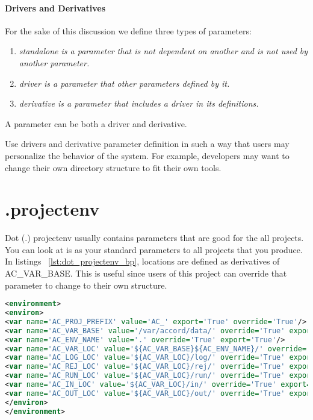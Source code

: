 \documentclass[design.tex]{subfiles}
\begin{document}
\paragraph{Drivers and Derivatives}
For the sake of this discussion we define three types of parameters:
\begin{enumerate}
	\item \em{standalone} is a parameter that is not dependent on another and is not used by another parameter.
	\item \em{driver} is a parameter that other parameters defined by it.
	\item \em{derivative} is a parameter that includes a driver in its definitions.
\end{enumerate}

A parameter can be both a driver and derivative.

Use drivers and derivative parameter definition in such a way that users may personalize the behavior of the system.  For example, developers may want to change their own directory structure to fit their own tools.
 

\section{.projectenv}
Dot (.) projectenv usually contains parameters that are good for the all projects.  You can look at is as your standard parameters to all projects that you produce. In listings ~\ref{lst:dot_projectenv_bp}, locations are defined as derivatives of AC\_VAR\_BASE. This is useful since users of this project can override that parameter to change to their own structure.

\begin{lstlisting}[language=XML, label=lst:dot_projectenv_bp, caption='.projectenv.xml example']
<environment>
<environ>
<var name='AC_PROJ_PREFIX' value='AC_' export='True' override='True'/>
<var name='AC_VAR_BASE' value='/var/accord/data/' override='True' export='True'/>
<var name='AC_ENV_NAME' value='.' override='True' export='True'/>
<var name='AC_VAR_LOC' value='${AC_VAR_BASE}${AC_ENV_NAME}/' override='True' export='True'/>
<var name='AC_LOG_LOC' value='${AC_VAR_LOC}/log/' override='True' export='True'/>
<var name='AC_REJ_LOC' value='${AC_VAR_LOC}/rej/' override='True' export='True'/>
<var name='AC_RUN_LOC' value='${AC_VAR_LOC}/run/' override='True' export='True'/>
<var name='AC_IN_LOC' value='${AC_VAR_LOC}/in/' override='True' export='True'/>
<var name='AC_OUT_LOC' value='${AC_VAR_LOC}/out/' override='True' export='True'/>
</environ>
</environment>
\end{lstlisting}
\end{document}
